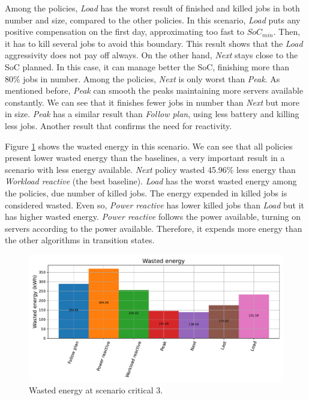 Among the policies, \emph{Load} has the worst result of finished and killed jobs in both number and size, compared to the other policies. In this scenario, \emph{Load} puts any positive compensation on the first day, approximating too fast to $SoC_{min}$. Then, it has to kill several jobs to avoid this boundary. This result shows that the \emph{Load} aggressivity does not pay off always. On the other hand, \emph{Next} stays close to the SoC planned. In this case, it can manage better the SoC, finishing more than 80\% jobs in number. Among the policies, \emph{Next} is only worst than \emph{Peak}. As mentioned before, \emph{Peak} can smooth the peaks maintaining more servers available constantly. We can see that it finishes fewer jobs in number than \emph{Next} but more in size. \emph{Peak} has a similar result than \emph{Follow plan}, using less battery and killing less jobs. Another result that confirms the need for reactivity.

Figure \ref{fig:energy_critical_3} shows the wasted energy in this scenario. We can see that all policies present lower wasted energy than the baselines, a very important result in a scenario with less energy available. \emph{Next} policy wasted 45.96\% less energy than \emph{Workload reactive} (the best baseline). \emph{Load} has the worst wasted energy among the policies, due number of killed jobs. The energy expended in killed jobs is considered wasted. Even so, \emph{Power reactive} has lower killed jobs than \emph{Load} but it has higher wasted energy. \emph{Power reactive} follows the power available, turning on servers according to the power available. Therefore, it expends more energy than the other algorithms in transition states.

\begin{figure}[!htb]
    \centering
    \includegraphics[scale=0.55]{Images/Compensations/energy_critical_3.pdf}
    \caption{Wasted energy at scenario critical 3.}
    \label{fig:energy_critical_3}
\end{figure}

